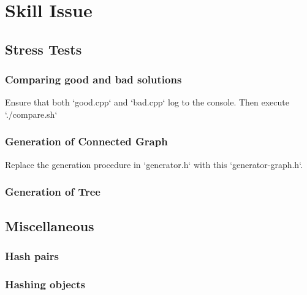 \chapter{Skill Issue}

\section{Stress Tests}
\subsection{Comparing good and bad solutions}
Ensure that both `good.cpp` and `bad.cpp` log to the console. Then execute `./compare.sh`



\subsection{Generation of Connected Graph}
Replace the generation procedure in `generator.h` with this `generator-graph.h`.

\subsection{Generation of Tree}

\section{Miscellaneous}
\subsection{Hash pairs}
\subsection{Hashing objects}

